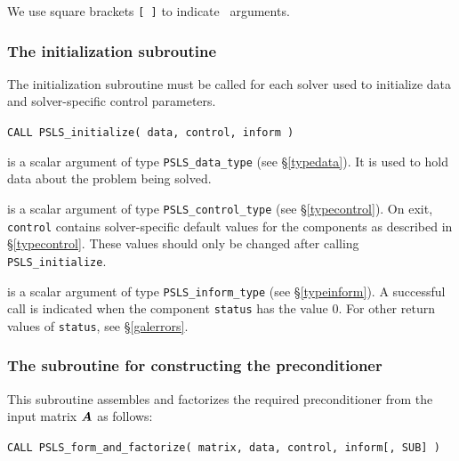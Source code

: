 \documentclass{galahad}
\newcommand{\packagename}{PSLS}
\begin{document}

\galarguments
We use square brackets {\tt [ ]} to indicate \optional\ arguments.


\subsubsection{The initialization subroutine}\label{subinit}
The initialization subroutine must be called for each solver used
to initialize data and solver-specific control parameters.

\hskip0.5in
{\tt CALL \packagename\_initialize( data, control, inform )}
\begin{description}

 is a scalar \intentout argument of type
{\tt \packagename\_data\_type}
(see \S\ref{typedata}). It is used to hold data about the problem being
solved.

 is a scalar \intentout argument of type
{\tt \packagename\_control\_type}
(see \S\ref{typecontrol}).
On exit, {\tt control} contains solver-specific default values for the
components as described in \S\ref{typecontrol}.
These values should only be changed after calling
{\tt \packagename\_initialize}.

 is a scalar \intentout argument of type
{\tt \packagename\_inform\_type}
(see \S\ref{typeinform}).
A successful call is indicated when the  component {\tt status} has the value 0.
For other return values of {\tt status}, see \S\ref{galerrors}.

\end{description}


\subsubsection{The subroutine for constructing the preconditioner}
This subroutine assembles and factorizes the required preconditioner
from the input matrix ${\bm{A}}$ as follows:

\hskip0.5in
{\tt CALL \packagename\_form\_and\_factorize( matrix, data, control, inform[, SUB] )}
\end{document}
